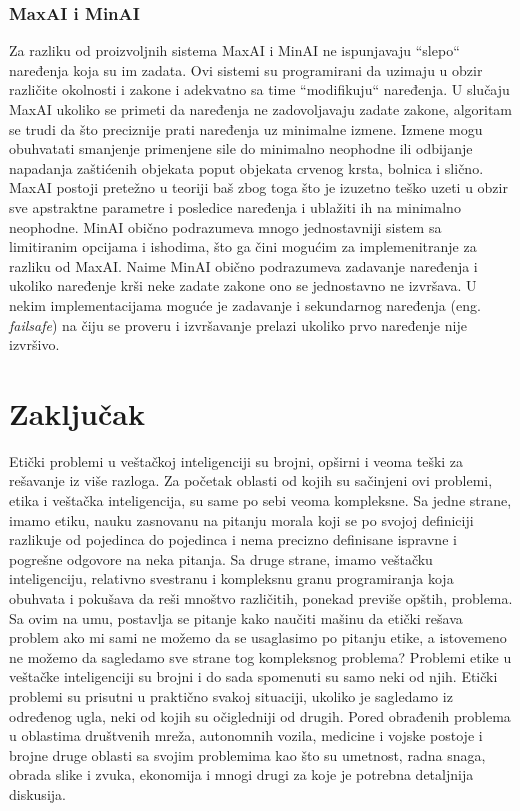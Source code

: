 \documentclass[a4paper]{article}
\begin{document}
\subsubsection{MaxAI i MinAI}
\label{subsubsec: MaxAI i MinAI}
Za razliku od proizvoljnih sistema MaxAI i MinAI ne ispunjavaju ``slepo`` naređenja koja su im zadata. Ovi sistemi su programirani da uzimaju u obzir različite okolnosti i zakone i adekvatno sa time ``modifikuju`` naređenja.
\newline
\newline
U slučaju MaxAI ukoliko se primeti da naređenja ne zadovoljavaju zadate zakone, algoritam se trudi da što preciznije prati naređenja uz minimalne izmene. Izmene mogu obuhvatati smanjenje primenjene sile do minimalno neophodne ili odbijanje napadanja zaštićenih objekata poput objekata crvenog krsta, bolnica i slično. MaxAI postoji pretežno u teoriji baš zbog toga što je izuzetno teško uzeti u obzir sve apstraktne parametre i posledice naređenja i ublažiti ih na minimalno neophodne.
\newline
\newline
MinAI obično podrazumeva mnogo jednostavniji sistem sa limitiranim opcijama i ishodima, što ga čini mogućim za implemenitranje za razliku od MaxAI. Naime MinAI obično podrazumeva zadavanje naređenja i ukoliko naređenje krši neke zadate zakone ono se jednostavno ne izvršava. U nekim implementacijama moguće je zadavanje i sekundarnog naređenja (eng. \textit{failsafe}) na čiju se proveru i izvršavanje prelazi ukoliko prvo naređenje nije izvršivo.

\section{Zaključak}
\label{sec: Zaključak}
Etički problemi u veštačkoj inteligenciji su brojni, opširni i veoma teški za rešavanje iz više razloga. Za početak oblasti od kojih su sačinjeni ovi problemi, etika i veštačka inteligencija, su same po sebi veoma kompleksne. Sa jedne strane, imamo etiku, nauku zasnovanu na pitanju morala koji se po svojoj definiciji razlikuje od pojedinca do pojedinca i nema precizno definisane ispravne i pogrešne odgovore na neka pitanja. Sa druge strane, imamo veštačku inteligenciju, relativno svestranu i kompleksnu granu programiranja koja obuhvata i pokušava da reši mnoštvo različitih, ponekad previše opštih, problema. Sa ovim na umu, postavlja se pitanje kako naučiti mašinu da etički rešava problem ako mi sami ne možemo da se usaglasimo po pitanju etike, a istovemeno ne možemo da sagledamo sve strane tog kompleksnog problema?
\newline
Problemi etike u veštačke inteligenciji su brojni i do sada spomenuti su samo neki od njih. Etički problemi su prisutni u praktično svakoj situaciji, ukoliko je sagledamo iz određenog ugla, neki od kojih su očigledniji od drugih. Pored obrađenih problema u oblastima društvenih mreža, autonomnih vozila, medicine i vojske postoje i brojne druge oblasti sa svojim problemima kao što su umetnost, radna snaga, obrada slike i zvuka, ekonomija i mnogi drugi za koje je potrebna detaljnija diskusija.

\newpage

\appendix
 


\appendix
\end{document}
